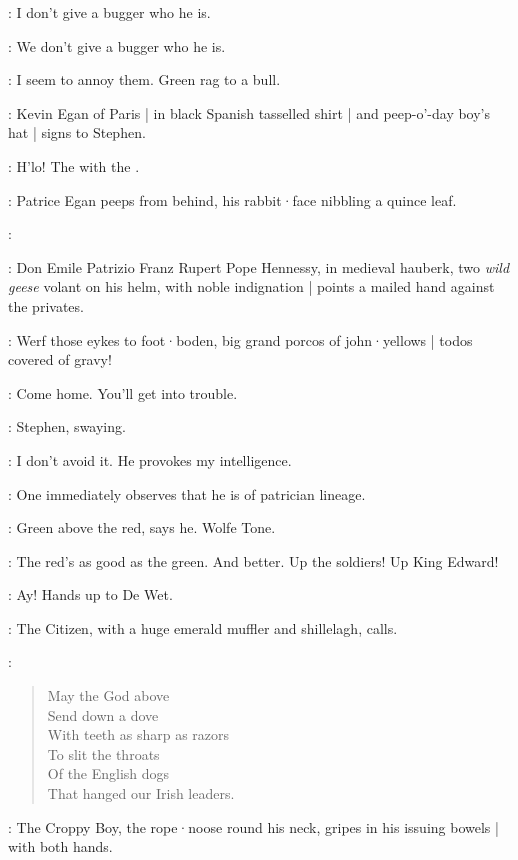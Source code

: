\Carr:
I don't give a bugger who he is.

\Compton:
We don't give a bugger who he is.

\Stephen:
I seem to annoy them.
Green rag to a bull.

:
Kevin Egan of Paris |
in black Spanish tasselled shirt |
and peep-o'-day boy's hat |
signs to Stephen.

\KevinEgan:
H'lo!
The  with the .

:
Patrice Egan peeps from behind,
his rabbit·face nibbling a quince leaf.

\Patrice:

:
Don Emile Patrizio Franz Rupert Pope Hennessy,
in medieval hauberk,
two \emph{wild geese} volant on his helm,
with noble indignation |
points a mailed hand against the privates.

\DonEmile:
Werf those eykes to foot·boden,
big grand porcos of john·yellows |
todos covered of gravy!

\Bloom:
Come home.
You'll get into trouble.

:
Stephen,
swaying.

\Stephen:
I don't avoid it.
He provokes my intelligence.

\BiddyClap[2]:
One immediately observes that he is of patrician lineage.

\Virago[2]:
Green above the red,
says he.
Wolfe Tone.

\Bawd[2]:
The red's as good as the green.
And better.
Up the soldiers!
Up King Edward!%

\ARough[2]:
Ay! Hands up to De Wet.

:
The Citizen,
with a huge emerald muffler and shillelagh,
calls.

\Citizen:
\begin{verse}
    May the God above\\
    Send down a dove\\
    With teeth as sharp as razors\\
    To slit the throats\\
    Of the English dogs\\
%
    That hanged our Irish leaders.
\end{verse}

:
The Croppy Boy,
the rope·noose round his neck,
gripes in his issuing bowels |
with both hands.

